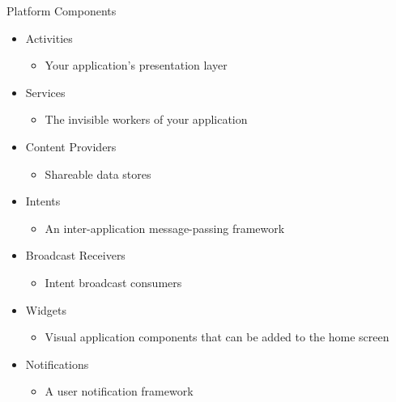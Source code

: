 \begin{frame}{Platform Components}
\begin{itemize}
  \item Activities
  \begin{itemize}
    \item Your application’s presentation layer
   \end{itemize}
  \item Services
  \begin{itemize}
  \item The invisible workers of your application
  \end{itemize}
  \item Content Providers
  \begin{itemize}
  \item Shareable data stores
  \end{itemize}
  \item Intents
  \begin{itemize}
  \item An inter-application message-passing framework
  \end{itemize}
  \item Broadcast Receivers
  \begin{itemize}
  \item Intent broadcast consumers
  \end{itemize}
  \item Widgets
  \begin{itemize} 
  \item Visual application components that can be added to the home
  screen
  \end{itemize}
  \item Notifications
  \begin{itemize}
  \item A user notification framework
  \end{itemize}
\end{itemize}
\end{frame}

